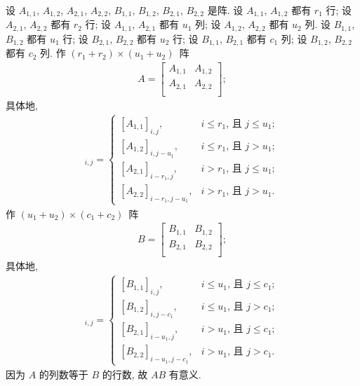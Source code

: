 \documentclass[../libro.tex]{subfiles}
\begin{document}
\begin{theorem}
    设
    \(A_{1,1}\), \(A_{1,2}\), \(A_{2,1}\), \(A_{2,2}\),
    \(B_{1,1}\), \(B_{1,2}\), \(B_{2,1}\), \(B_{2,2}\)
    是阵.
    设 \(A_{1,1}\), \(A_{1,2}\) 都有 \(r_1\) 行;
    设 \(A_{2,1}\), \(A_{2,2}\) 都有 \(r_2\) 行;
    设 \(A_{1,1}\), \(A_{2,1}\) 都有 \(u_1\) 列;
    设 \(A_{1,2}\), \(A_{2,2}\) 都有 \(u_2\) 列.
    设 \(B_{1,1}\), \(B_{1,2}\) 都有 \(u_1\) 行;
    设 \(B_{2,1}\), \(B_{2,2}\) 都有 \(u_2\) 行;
    设 \(B_{1,1}\), \(B_{2,1}\) 都有 \(c_1\) 列;
    设 \(B_{1,2}\), \(B_{2,2}\) 都有 \(c_2\) 列.
    作 \((r_1 + r_2) \times (u_1 + u_2)\)~阵
    \begin{align*}
        A =
        \begin{bmatrix}
            A_{1,1} & A_{1,2} \\
            A_{2,1} & A_{2,2} \\
        \end{bmatrix};
    \end{align*}
    具体地,
    \begin{align*}
        [A]_{i,j} =
        \begin{cases}
            [A_{1,1}]_{i,j},
            & \text{\(i \leq r_1\), 且 \(j \leq u_1\)}; \\
            [A_{1,2}]_{i,j-u_1},
            & \text{\(i \leq r_1\), 且 \(j > u_1\)};    \\
            [A_{2,1}]_{i-r_1,j},
            & \text{\(i > r_1\), 且 \(j \leq u_1\)};    \\
            [A_{2,2}]_{i-r_1,j-u_1},
            & \text{\(i > r_1\), 且 \(j > u_1\)}.
        \end{cases}
    \end{align*}
    作 \((u_1 + u_2) \times (c_1 + c_2)\)~阵
    \begin{align*}
        B =
        \begin{bmatrix}
            B_{1,1} & B_{1,2} \\
            B_{2,1} & B_{2,2} \\
        \end{bmatrix};
    \end{align*}
    具体地,
    \begin{align*}
        [B]_{i,j} =
        \begin{cases}
            [B_{1,1}]_{i,j},
            & \text{\(i \leq u_1\), 且 \(j \leq c_1\)}; \\
            [B_{1,2}]_{i,j-c_1},
            & \text{\(i \leq u_1\), 且 \(j > c_1\)};    \\
            [B_{2,1}]_{i-u_1,j},
            & \text{\(i > u_1\), 且 \(j \leq c_1\)};    \\
            [B_{2,2}]_{i-u_1,j-c_1},
            & \text{\(i > u_1\), 且 \(j > c_1\)}.
        \end{cases}
    \end{align*}
    因为 \(A\) 的列数等于 \(B\) 的行数,
    故 \(AB\) 有意义.


\end{theorem}
\end{document}
